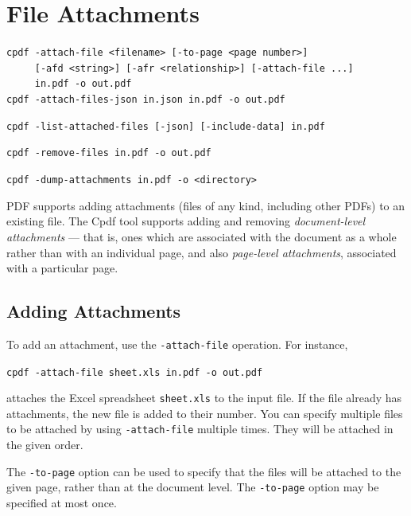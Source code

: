 \documentclass{book}
\begin{document}
\chapter{File Attachments}\label{chap:12}\pagestyle{fancy}
\begin{framed}
  \small\noindent\verb!cpdf -attach-file <filename> [-to-page <page number>]!\\
  \small\noindent\verb!     [-afd <string>] [-afr <relationship>] [-attach-file ...]!\\
  \small\noindent\verb!     in.pdf -o out.pdf!\\
  \small\noindent\verb!cpdf -attach-files-json in.json in.pdf -o out.pdf!

  \vspace{1.5mm}
  \small\noindent\verb!cpdf -list-attached-files [-json] [-include-data] in.pdf!

  \vspace{1.5mm}
  \small\noindent\verb!cpdf -remove-files in.pdf -o out.pdf!

  \vspace{1.5mm}
  \small\noindent\verb!cpdf -dump-attachments in.pdf -o <directory>!
\end{framed}

  PDF supports adding attachments (files of any kind, including other PDFs) to
an existing file. The Cpdf tool supports adding and removing \textit{document-level
attachments} --- that is, ones which are associated with the document as a
whole rather than with an individual page, and also \textit{page-level attachments}, associated with a particular page.
  \section{Adding Attachments}
  To add an attachment, use the \texttt{-attach-file} operation. For instance,

  \begin{framed}
  \noindent\small\verb!cpdf -attach-file sheet.xls in.pdf -o out.pdf!
  \end{framed}

  \noindent attaches the Excel spreadsheet \texttt{sheet.xls} to the input file. If the file already has attachments, the new file is added to their number. You can specify multiple files to be attached by using \verb!-attach-file! multiple times. They will be attached in the given order.
  
  The \texttt{-to-page} option can be used to specify that the files will be attached to the given page, rather than at the document level. The \texttt{-to-page} option may be specified at most once. 
\end{document}
